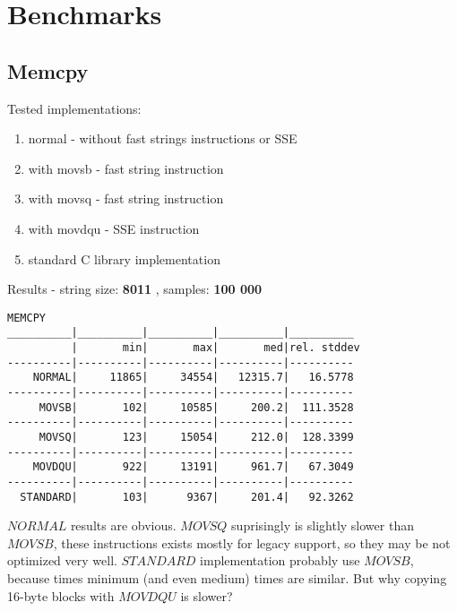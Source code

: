 \documentclass[11pt,a4paper]{article}
\begin{document}
\section{Benchmarks}\label{sec:benchmarks}

\subsection{Memcpy}\label{subsec:memcpy}
    Tested implementations:
    \begin{enumerate}
        \item normal - without fast strings instructions or SSE
        \item with movsb - fast string instruction
        \item with movsq - fast string instruction
        \item with movdqu - SSE instruction
        \item standard C library implementation
    \end{enumerate}





Results - string size: \textbf{8011} , samples: \textbf{100 000}
\begin{lstlisting}[]
MEMCPY
__________|__________|__________|__________|__________
          |       min|       max|       med|rel. stddev
----------|----------|----------|----------|----------
    NORMAL|     11865|     34554|   12315.7|   16.5778
----------|----------|----------|----------|----------
     MOVSB|       102|     10585|     200.2|  111.3528
----------|----------|----------|----------|----------
     MOVSQ|       123|     15054|     212.0|  128.3399
----------|----------|----------|----------|----------
    MOVDQU|       922|     13191|     961.7|   67.3049
----------|----------|----------|----------|----------
  STANDARD|       103|      9367|     201.4|   92.3262
\end{lstlisting}
$NORMAL$ results are obvious. $MOVSQ$ suprisingly is slightly slower than $MOVSB$, these instructions exists mostly for legacy support, so they may be not optimized very well.
$STANDARD$ implementation probably use $MOVSB$, because times minimum (and even medium) times are similar.
But why copying 16-byte blocks with $MOVDQU$ is slower?
\end{document}
